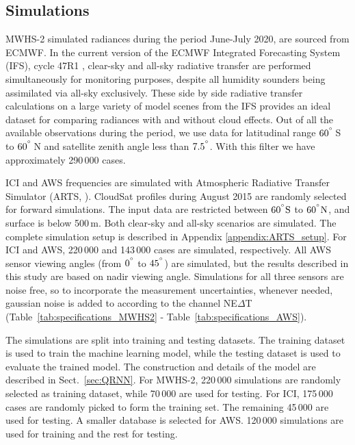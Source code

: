 \documentclass[amt, manuscript]{copernicus}
\begin{document}
\subsection{Simulations}
%
MWHS-2 simulated radiances during the period June-July 2020, are sourced from ECMWF. In the current version of the ECMWF Integrated Forecasting System (IFS), cycle 47R1 \citep{IFS47R1chap1}, clear-sky and all-sky radiative transfer are performed simultaneously for monitoring purposes, despite all humidity sounders being assimilated via all-sky exclusively. These side by side radiative transfer calculations on a large variety of model scenes from the IFS provides an ideal dataset for comparing radiances with and without cloud effects. Out of all the available observations during the period, we use data for latitudinal range $60^{^{\circ}}$\,S to $60^{^{\circ}}$\,N and satellite zenith angle less than $7.5^{^{\circ}}$. With this filter we have approximately 290\,000 cases.

ICI and AWS frequencies are simulated with Atmospheric Radiative Transfer Simulator (ARTS, \citet{buehler:artst:18}). CloudSat \citep{Stephens2002cloudsat} profiles during August 2015 are randomly selected for forward simulations. The input data are restricted between $60\unit{^{\degree}S}$ to $60\unit{^{\degree}N}$, and surface is below 500\,m. Both clear-sky and all-sky scenarios  are simulated. The complete simulation setup is described in Appendix \ref{appendix:ARTS_setup}. For ICI and AWS, 220\,000 and 143\,000 cases are simulated, respectively. All AWS sensor viewing angles (from $0^{^{\circ}}$ to $45^{^{\circ}}$) are simulated, but the results described in this study are based on nadir viewing angle. Simulations for all three sensors are noise free, so to incorporate the measurement uncertainties, whenever needed, gaussian noise is added to according to the channel NE$\Delta$T (Table~\ref{tab:specifications_MWHS2} - Table~\ref{tab:specifications_AWS}). 

The simulations are split into training and testing datasets. The training dataset is used to train the machine learning model, while the testing dataset is used to evaluate the trained model. The construction and details of the model are described in Sect.~\ref{sec:QRNN}. For MWHS-2, 220\,000 simulations are randomly selected as training dataset, while 70\,000 are used for testing. For ICI, 175\,000 cases are randomly picked to form the training set. The remaining 45\,000 are used for testing. A smaller database is selected for AWS. 120\,000 simulations are used for training and the rest for testing.
\end{document}
